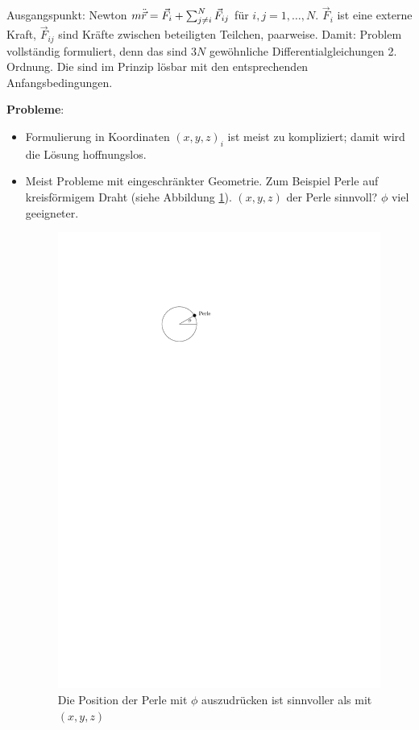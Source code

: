 Ausgangspunkt: Newton $m \ddot{\vec{r}} = \vec{F}_i + \sum^N_{j \neq i} \vec{F}_{ij}$ für $i, j = 1, \dots, N$. $\vec{F}_i$ ist eine externe Kraft, $\vec{F}_{ij}$ sind Kräfte zwischen beteiligten Teilchen, paarweise. Damit: Problem vollständig formuliert, denn das sind $3N$ gewöhnliche Differentialgleichungen 2. Ordnung. Die sind im Prinzip lösbar mit den entsprechenden Anfangsbedingungen.

\textbf{Probleme}: 
\begin{itemize}
	\item Formulierung in Koordinaten $(x, y, z)_i$ ist meist zu kompliziert; damit wird die Lösung hoffnungslos.
	\item Meist Probleme mit eingeschränkter Geometrie. Zum Beispiel Perle auf kreisförmigem Draht (siehe Abbildung \ref{fig:ch1_perleaufdraht}). $(x, y, z)$ der Perle sinnvoll? $\phi$ viel geeigneter.
	\begin{figure}
		\centering
		\includegraphics{figures/ch1/perleaufdraht}
		\caption{Die Position der Perle mit $\phi$ auszudrücken ist sinnvoller als mit $(x, y, z)$}
		\label{fig:ch1_perleaufdraht}
	\end{figure}
\end{itemize}

